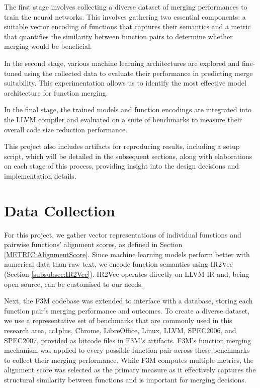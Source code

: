The first stage involves collecting a diverse dataset of merging performances to train the neural networks. This involves gathering two essential components: a suitable vector encoding of functions that captures their semantics and a metric that quantifies the similarity between function pairs to determine whether merging would be beneficial.

In the second stage, various machine learning architectures are explored and fine-tuned using the collected data to evaluate their performance in predicting merge suitability. This experimentation allows us to identify the most effective model architecture for function merging.

In the final stage, the trained models and function encodings are integrated into the LLVM compiler and evaluated on a suite of benchmarks to measure their overall code size reduction performance.

This project also includes artifacts for reproducing results, including a setup script, which will be detailed in the subsequent sections, along with elaborations on each stage of this process, providing insight into the design decisions and implementation details.

\section{Data Collection} \label{Design:DataCollection}
For this project, we gather vector representations of individual functions and pairwise functions' alignment scores, as defined in Section \ref{METRIC:AlignmentScore}. Since machine learning models perform better with numerical data than raw text, we encode function semantics using IR2Vec (Section \ref{subsubsec:IR2Vec}). IR2Vec operates directly on LLVM IR and, being open source, can be customised to our needs.

Next, the F3M codebase was extended to interface with a database, storing each function pair's merging performance and outcomes. To create a diverse dataset, we use a representative set of benchmarks that are commonly used in this research area, cc1plus, Chrome, LibreOffice, Linux, LLVM, SPEC2006, and SPEC2007, provided as bitcode files in F3M's artifacts. F3M's function merging mechanism was applied to every possible function pair across these benchmarks to collect their merging performance. While F3M computes multiple metrics, the alignment score was selected as the primary measure as it effectively captures the structural similarity between functions and is important for merging decisions.

